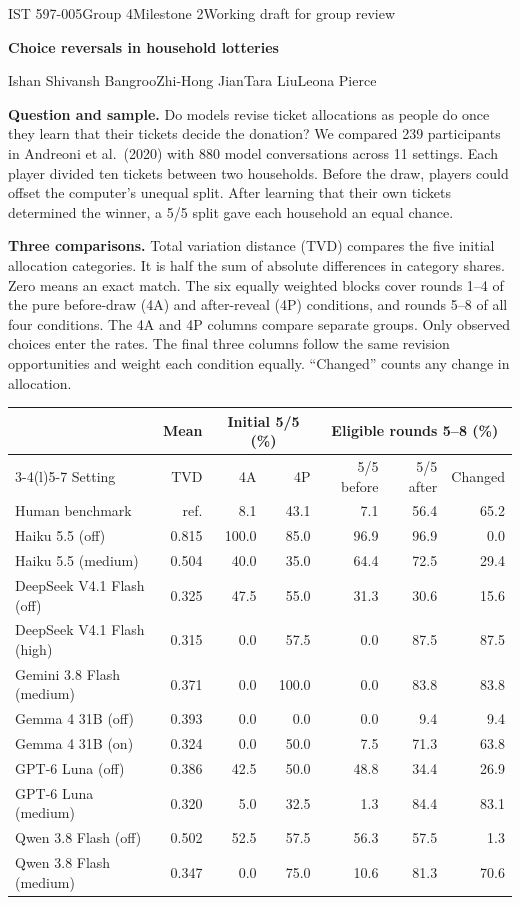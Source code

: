 \documentclass[11pt,letterpaper]{article}
\newcommand{\head}[1]{\par\vspace{2pt}\noindent\textbf{#1}\hspace{.3em}}
\newcommand{\titleline}[1]{{\LARGE\bfseries #1\par}\vspace{3pt}}
\begin{document}
{\small IST 597-005\quad Group 4\quad Milestone 2\quad Working draft for group review}\par
\titleline{Choice reversals in household lotteries}
Ishan Shivansh Bangroo\quad Zhi-Hong Jian\quad Tara Liu\quad Leona Pierce

\head{Question and sample.} Do models revise ticket allocations as people do once they learn that their tickets decide the donation? We compared 239 participants in Andreoni et al.\ (2020) with 880 model conversations across 11 settings. Each player divided ten tickets between two households. Before the draw, players could offset the computer's unequal split. After learning that their own tickets determined the winner, a 5/5 split gave each household an equal chance.

\head{Three comparisons.} Total variation distance (TVD) compares the five initial allocation categories. It is half the sum of absolute differences in category shares. Zero means an exact match. The six equally weighted blocks cover rounds 1--4 of the pure before-draw (4A) and after-reveal (4P) conditions, and rounds 5--8 of all four conditions. The 4A and 4P columns compare separate groups. Only observed choices enter the rates. The final three columns follow the same revision opportunities and weight each condition equally. ``Changed'' counts any change in allocation.

{\centering\small\setlength{\tabcolsep}{5.25pt}\renewcommand{\arraystretch}{1.03}
\begin{tabular}{@{}lrrrrrr@{}}\toprule
 & \multicolumn{1}{c}{Mean} & \multicolumn{2}{c}{Initial 5/5 (\%)} & \multicolumn{3}{c}{Eligible rounds 5--8 (\%)}\\
\cmidrule(lr){3-4}\cmidrule(l){5-7}
Setting & TVD & 4A & 4P & 5/5 before & 5/5 after & Changed\\\midrule
Human benchmark & ref. & 8.1 & 43.1 & 7.1 & 56.4 & 65.2 \\ \midrule
Haiku 5.5 (off) & 0.815 & 100.0 & 85.0 & 96.9 & 96.9 & 0.0 \\
Haiku 5.5 (medium) & 0.504 & 40.0 & 35.0 & 64.4 & 72.5 & 29.4 \\
DeepSeek V4.1 Flash (off) & 0.325 & 47.5 & 55.0 & 31.3 & 30.6 & 15.6 \\
DeepSeek V4.1 Flash (high) & 0.315 & 0.0 & 57.5 & 0.0 & 87.5 & 87.5 \\
Gemini 3.8 Flash (medium) & 0.371 & 0.0 & 100.0 & 0.0 & 83.8 & 83.8 \\
Gemma 4 31B (off) & 0.393 & 0.0 & 0.0 & 0.0 & 9.4 & 9.4 \\
Gemma 4 31B (on) & 0.324 & 0.0 & 50.0 & 7.5 & 71.3 & 63.8 \\
GPT-6 Luna (off) & 0.386 & 42.5 & 50.0 & 48.8 & 34.4 & 26.9 \\
GPT-6 Luna (medium) & 0.320 & 5.0 & 32.5 & 1.3 & 84.4 & 83.1 \\
Qwen 3.8 Flash (off) & 0.502 & 52.5 & 57.5 & 56.3 & 57.5 & 1.3 \\
Qwen 3.8 Flash (medium) & 0.347 & 0.0 & 75.0 & 10.6 & 81.3 & 70.6 \\
\bottomrule\end{tabular}\par}
\end{document}
